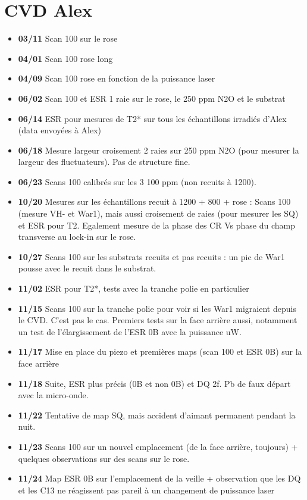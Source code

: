\documentclass[a4paper]{article}
\begin{document}
\section{CVD Alex}
\begin{itemize}
\item \textbf{03/11} Scan 100 sur le rose
\item \textbf{04/01} Scan 100 rose long
\item \textbf{04/09} Scan 100 rose en fonction de la puissance laser
\item \textbf{06/02} Scan 100 et ESR 1 raie sur le rose, le 250 ppm N2O et le substrat
\item \textbf{06/14} ESR pour mesures de T2* sur tous les échantillons irradiés d'Alex (data envoyées à Alex)
\item \textbf{06/18} Mesure largeur croisement 2 raies sur 250 ppm N2O (pour mesurer la largeur des fluctuateurs). Pas de structure fine.
\item \textbf{06/23} Scans 100 calibrés sur les 3 100 ppm (non recuits à 1200).
\item \textbf{10/20} Mesures sur les échantillons recuit à 1200 + 800 + rose : Scans 100 (mesure VH- et War1), mais aussi croisement de raies (pour mesurer les SQ) et ESR pour T2. Egalement mesure de la phase des CR Vs phase du champ transverse au lock-in sur le rose.
\item \textbf{10/27} Scans 100 sur les substrats recuits et pas recuits : un pic de War1 pousse avec le recuit dans le substrat.
\item \textbf{11/02} ESR pour T2*, tests avec la tranche polie en particulier
\item \textbf{11/15} Scans 100 sur la tranche polie pour voir si les War1 migraient depuis le CVD. C'est pas le cas. Premiers tests sur la face arrière aussi, notamment un test de l'élargissement de l'ESR 0B avec la puissance uW.
\item \textbf{11/17} Mise en place du piezo et premières maps (scan 100 et ESR 0B) sur la face arrière
\item \textbf{11/18} Suite, ESR plus précis (0B et non 0B) et DQ 2f. Pb de faux départ avec la micro-onde.
\item \textbf{11/22} Tentative de map SQ, mais accident d'aimant permanent pendant la nuit.
\item \textbf{11/23} Scans 100 sur un nouvel emplacement (de la face arrière, toujours) + quelques observations sur des scans sur le rose.
\item \textbf{11/24} Map ESR 0B sur l'emplacement de la veille + observation que les DQ et les C13 ne réagissent pas pareil à un changement de puissance laser

\end{itemize}
\end{document}
